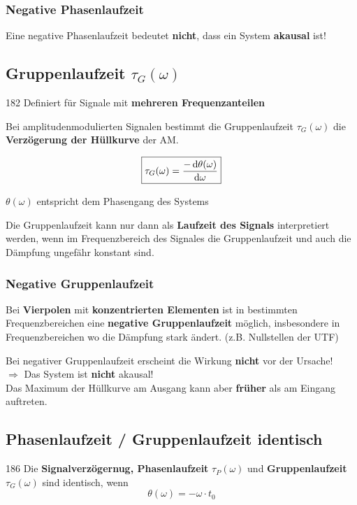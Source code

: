 \subsubsection{Negative Phasenlaufzeit}
Eine negative Phasenlaufzeit bedeutet \textbf{nicht}, dass ein System \textbf{akausal} ist!


\subsection{Gruppenlaufzeit \texorpdfstring{$\tau_G(\omega)$}{tG(w)} }{182}
Definiert für Signale mit \textbf{mehreren Frequenzanteilen}\medskip

Bei amplitudenmodulierten Signalen bestimmt die Gruppenlaufzeit $\tau_G(\omega)$ die \textbf{Verzögerung der Hüllkurve} der AM.

$$ \boxed{ \tau_G(\omega) = \frac{-\mathop{} \! \mathrm{d} \theta(\omega)}{\mathop{} \! \mathrm{d} \omega} } $$

$\theta(\omega)$ entspricht dem Phasengang des Systems\medskip

Die Gruppenlaufzeit kann nur dann als \textbf{Laufzeit des Signals} interpretiert werden, wenn im Frequenzbereich des Signales 
die Gruppenlaufzeit und auch die Dämpfung ungefähr konstant sind.


\subsubsection{Negative Gruppenlaufzeit}
Bei \textbf{Vierpolen} mit \textbf{konzentrierten Elementen} ist in bestimmten Frequenzbereichen eine 
\textbf{negative Gruppenlaufzeit} möglich, insbesondere in Frequenzbereichen wo die Dämpfung stark ändert.
(z.B. Nullstellen der UTF) 

Bei negativer Gruppenlaufzeit erscheint die Wirkung \textbf{nicht} vor der Ursache! \\
$\Rightarrow$ Das System ist \textbf{nicht} akausal! \\
Das Maximum der Hüllkurve am Ausgang kann aber \textbf{früher} als am Eingang auftreten.


\subsection{Phasenlaufzeit / Gruppenlaufzeit identisch}{186}\label{Phasenlaufzeit / Gruppenlaufzeit identisch}
Die \textbf{Signalverzögernug, Phasenlaufzeit} $\tau_P(\omega)$ und \textbf{Gruppenlaufzeit} 
$\tau_G(\omega)$ sind identisch, wenn
$$ \boxed{ \theta(\omega) = - \omega \cdot t_0  } $$

